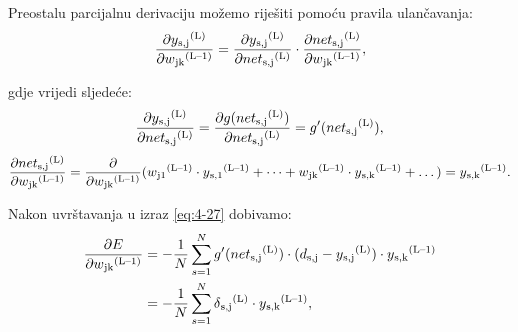 \documentclass[times, utf8, zavrsni]{fer}
\begin{document}
Preostalu parcijalnu derivaciju možemo riješiti pomoću pravila ulančavanja:
\begin{equation}
    \frac{\partial y\textsubscript{s,j}\textsuperscript{(L)}}{\partial w\textsubscript{jk}\textsuperscript{(L--1)}} = \frac{\partial y\textsubscript{s,j}\textsuperscript{(L)}}{\partial net\textsubscript{s,j}\textsuperscript{(L)}} \cdot \frac{\partial net\textsubscript{s,j}\textsuperscript{(L)}}{\partial w\textsubscript{jk}\textsuperscript{(L--1)}},
\end{equation}

gdje vrijedi sljedeće:
\begin{equation}
    \frac{\partial y\textsubscript{s,j}\textsuperscript{(L)}}{\partial net\textsubscript{s,j}\textsuperscript{(L)}} = \frac{\partial g(net\textsubscript{s,j}\textsuperscript{(L)})}{\partial net\textsubscript{s,j}\textsuperscript{(L)}} = g'(net\textsubscript{s,j}\textsuperscript{(L)}),
\end{equation}
\begin{equation}
    \frac{\partial net\textsubscript{s,j}\textsuperscript{(L)}}{\partial w\textsubscript{jk}\textsuperscript{(L--1)}} = \frac{\partial}{\partial w\textsubscript{jk}\textsuperscript{(L--1)}}(w\textsubscript{j1}\textsuperscript{(L--1)}\cdot y\textsubscript{s,1}\textsuperscript{(L--1)} + \dots + w\textsubscript{jk}\textsuperscript{(L--1)}\cdot y\textsubscript{s,k}\textsuperscript{(L--1)} + \dots) = y\textsubscript{s,k}\textsuperscript{(L--1)}.
\end{equation}

Nakon uvrštavanja u izraz \eqref{eq:4-27} dobivamo:
\begin{align}
    \frac{\partial E}{\partial w\textsubscript{jk}\textsuperscript{(L--1)}} &= -\frac{1}{N}\sum\limits_{s=1}^N g'(net\textsubscript{s,j}\textsuperscript{(L)})\cdot(d\textsubscript{s,j} - y\textsubscript{s,j}\textsuperscript{(L)})\cdot y\textsubscript{s,k}\textsuperscript{(L--1)} \\
    &= -\frac{1}{N}\sum\limits_{s=1}^N \delta\textsubscript{s,j}\textsuperscript{(L)} \cdot y\textsubscript{s,k}\textsuperscript{(L--1)},
\end{align}
\end{document}
